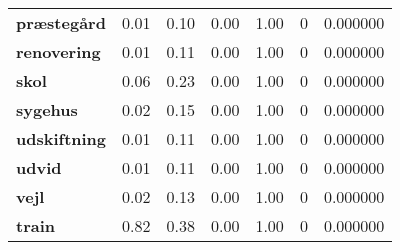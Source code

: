 \begin{longtable}{lllllrr}
\textbf{præstegård} & 0.01 & 0.10 & 0.00 & 1.00 & 0 & 0.000000 \\
\textbf{renovering} & 0.01 & 0.11 & 0.00 & 1.00 & 0 & 0.000000 \\
\textbf{skol} & 0.06 & 0.23 & 0.00 & 1.00 & 0 & 0.000000 \\
\textbf{sygehus} & 0.02 & 0.15 & 0.00 & 1.00 & 0 & 0.000000 \\
\textbf{udskiftning} & 0.01 & 0.11 & 0.00 & 1.00 & 0 & 0.000000 \\
\textbf{udvid} & 0.01 & 0.11 & 0.00 & 1.00 & 0 & 0.000000 \\
\textbf{vejl} & 0.02 & 0.13 & 0.00 & 1.00 & 0 & 0.000000 \\
\textbf{train} & 0.82 & 0.38 & 0.00 & 1.00 & 0 & 0.000000 \\
\end{longtable}
